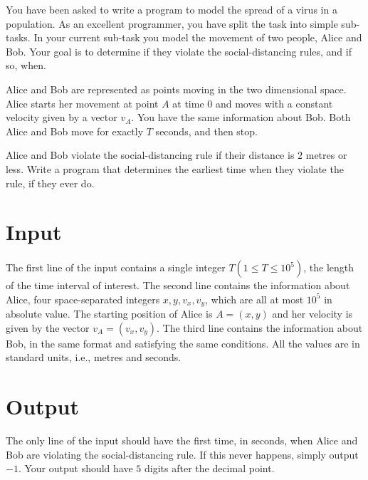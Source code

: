 You have been asked to write a program to model the spread of a virus in a population.
As an excellent programmer, you have split the task into simple sub-tasks.
In your current sub-task you model the movement of two people, Alice and Bob.
Your goal is to determine if they violate the social-distancing rules, and if so, when.

Alice and Bob are represented as points moving in the two dimensional space.
Alice starts her movement at point $A$ at time $0$ and
moves with a constant velocity given by a vector $v_A$.
You have the same information about Bob.
Both Alice and Bob move for exactly $T$ seconds, and then stop.

Alice and Bob violate the social-distancing rule if their distance is $2$ metres or less.
Write a program that determines the earliest time when they violate the rule, if they ever do.

\section*{Input}
The first line of the input contains a single integer $T (1 \leq T \leq 10^5)$, the length of the time interval of interest.
The second line contains the information about Alice, four space-separated integers $x, y, v_x, v_y$,  which are all at most $10^5$ in absolute value.
The starting position of Alice is $A = (x, y)$ and her velocity is given by the vector $v_A = (v_x, v_y)$.
The third line contains the information about Bob, in the same format and satisfying the same conditions.
All the values are in standard units, i.e., metres and seconds.

\section*{Output}
The only line of the input should have the first time, in seconds,
when Alice and Bob are violating the social-distancing rule.
If this never happens, simply output $-1$.
Your output should have $5$ digits after the decimal point.

